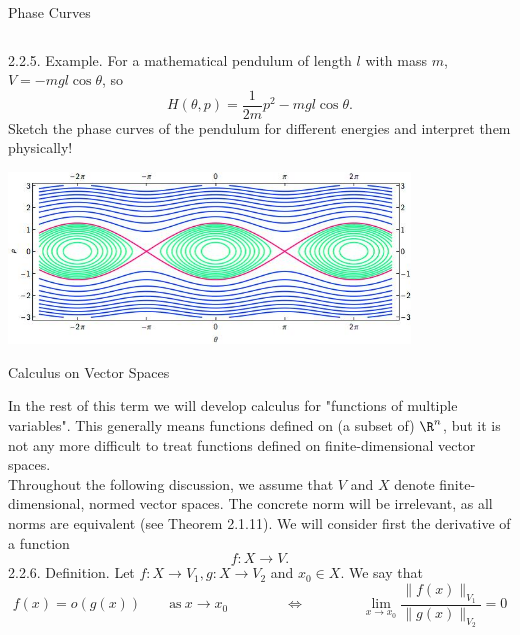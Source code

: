 \documentclass[smaller,hyperref={CJKbookmarks=true}]{beamer}
\begin{document}
\begin{frame}{Phase Curves}
\begin{spacing}{1.05}
\begin{columns}[c,onlytextwidth]
\begin{column}{0.4\textwidth}
\end{column}
\end{columns}
\newpage
\alert{2.2.5. Example.} For a mathematical pendulum of length $l$ with mass $m$, $V=-mgl\cos\theta$, so
\[H(\theta,p)=\frac{1}{2m}p^2-mgl\cos\theta.\]
Sketch the phase curves of the pendulum for dif{}ferent energies and
interpret them physically!\\
\begin{center}
\includegraphics[width=0.8\textwidth]{mt6.jpg}
\end{center}
\end{spacing}
\end{frame}
\begin{frame}[t]{Calculus on Vector Spaces}
\begin{spacing}{1.1}
In the rest of this term we will develop calculus for "functions of multiple
variables". This generally means functions defined on (a subset of) $\R^n$, but
it is not any more dif{}ficult to treat functions defined on finite-dimensional
vector spaces.\\[6pt]
Throughout the following discussion, we assume that $V$ and $X$ denote
finite-dimensional, normed vector spaces. The concrete norm will be
irrelevant, as all norms are equivalent (see Theorem 2.1.11). We will
consider first the derivative of a function
\[f:X\to V.\]
\alert{2.2.6. Definition.} Let $f:X\to V_1,g:X\to V_2$ and $x_0\in X$. We say that
\[f(x)=o(g(x))\qquad\text{as}~x\to x_0\qquad\qquad\Leftrightarrow\qquad\qquad\lim_{x\to x_0}\frac{\|f(x)\|_{V_1}}{\|g(x)\|_{V_2}}=0\]
\end{spacing}
\end{frame}
\end{document}

